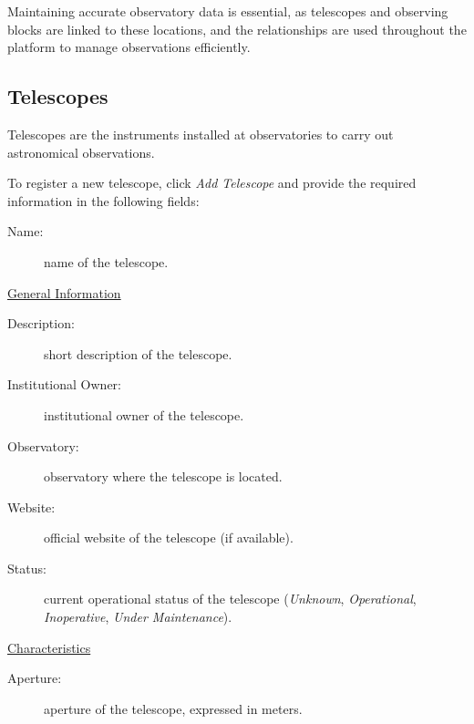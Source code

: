 
Maintaining accurate observatory data is essential, as telescopes and observing blocks are linked to these locations, and the relationships are used throughout the platform to manage observations efficiently.



\subsection{Telescopes}

Telescopes are the instruments installed at observatories to carry out astronomical observations. 

To register a new telescope, click \textsl{Add Telescope} and provide the required information in the following fields:

\newpage

\begin{description}
	\item[Name:] name of the telescope.
\end{description}


\underline{General Information}

\begin{description}
	\item[Description:] short description of the telescope.
	\item[Institutional Owner:] institutional owner of the telescope.
	\item[Observatory:] observatory where the telescope is located.
	\item[Website:] official website of the telescope (if available).
	\item[Status:] current operational status of the telescope (\textsl{Unknown}, \textsl{Operational}, \textsl{Inoperative}, \textsl{Under Maintenance}).
\end{description}



\underline{Characteristics}

\begin{description}
	\item[Aperture:] aperture of the telescope, expressed in meters.
\end{description}

